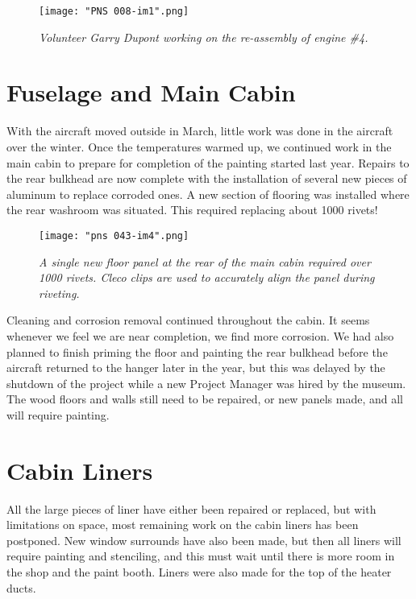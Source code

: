 \begin{figure}[htbp]
   \vspace{2em}
   \centering
   \texttt{[image: "PNS 008-im1".png]}
   \caption*{\small \em Volunteer Garry Dupont working on the re-assembly of engine \#4.}
   \label{fig:engine_no_4}
\end{figure}

\section{Fuselage and Main Cabin}
\label{sec:main_cabin}

With the aircraft moved outside in March, little work was done in the aircraft
over the winter. Once the temperatures warmed up, we continued work in the main
cabin to prepare for completion of the painting started last year. Repairs to
the rear bulkhead are now complete with the installation of several new pieces
of aluminum to replace corroded ones. A new section of flooring was installed
where the rear washroom was situated. This required replacing about 1000 rivets!

\begin{figure}[htbp]
   \vspace{2em}
   \centering
   \texttt{[image: "pns 043-im4".png]}
   \caption*{\small \em A single new floor panel at the rear of the main cabin required over 1000 rivets.  
   Cleco clips are used to accurately align the panel during riveting.}
   \label{fig:panel_revets}
\end{figure}

Cleaning and corrosion removal continued throughout the cabin. It seems whenever
we feel we are near completion, we find more corrosion. We had also planned to
finish priming the floor and painting the rear bulkhead before the aircraft
returned to the hanger later in the year, but this was delayed by the shutdown
of the project while a new Project Manager was hired by the museum. The wood
floors and walls still need to be repaired, or new panels made, and all will
require painting. 

\section{Cabin Liners}
\label{sec:liners}

All the large pieces of liner have either been repaired or replaced, but with
limitations on space, most remaining work on the cabin liners has been
postponed. New window surrounds have also been made, but then all liners will
require painting and stenciling, and this must wait until there is more room in
the shop and the paint booth. Liners were also made for the top of the heater
ducts.

